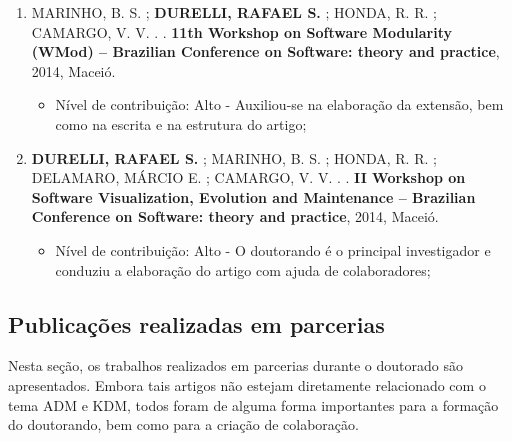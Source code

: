 \begin{itemize}
\begin{enumerate}
		\item MARINHO, B. S. ; \textbf{DURELLI, RAFAEL S.} ; HONDA, R. R. ; CAMARGO, V. V. . . \textbf{11th Workshop on Software Modularity (WMod) -- Brazilian Conference on Software: theory and practice}, 2014, Maceió.
		
		\begin{itemize}
			        \item Nível de contribuição: Alto - Auxiliou-se na elaboração da extensão, bem como na escrita e na estrutura do artigo;
			    \end{itemize}
		
		\item \textbf{DURELLI, RAFAEL S.} ; MARINHO, B. S. ; HONDA, R. R. ; DELAMARO, MÁRCIO E. ; CAMARGO, V. V. . . \textbf{II Workshop on Software Visualization, Evolution and Maintenance -- Brazilian Conference on Software: theory and practice}, 2014, Maceió.
		
		    \begin{itemize}
			        \item Nível de contribuição: Alto - O doutorando é o principal investigador e conduziu a elaboração do artigo com ajuda de colaboradores;
			    \end{itemize}
\end{enumerate}
\end{itemize}

\subsection{Publicações realizadas em parcerias}

Nesta seção, os trabalhos realizados em parcerias durante o doutorado são apresentados. Embora tais artigos não estejam diretamente relacionado com o tema ADM e KDM, todos foram de alguma forma importantes para a formação do doutorando, bem como para a criação de colaboração.

